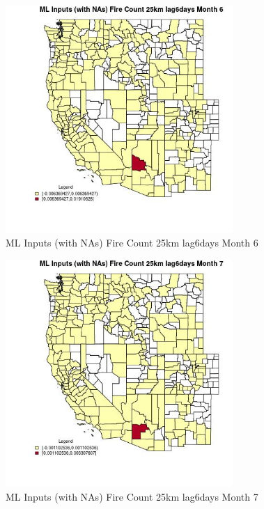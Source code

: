 \begin{figure} 
\centering  
\includegraphics[width=0.77\textwidth]{Code_Outputs/Report_ML_input_PM25_Step4_part_e_de_duplicated_aves_compiled_2019-05-20wNAs_CountyFire_Count_25km_lag6daysmedianMonth6.jpg} 
\caption{\label{fig:Report_ML_input_PM25_Step4_part_e_de_duplicated_aves_compiled_2019-05-20wNAsCountyFire_Count_25km_lag6daysmedianMonth6}ML Inputs (with NAs) Fire Count 25km lag6days Month 6} 
\end{figure} 
 

\begin{figure} 
\centering  
\includegraphics[width=0.77\textwidth]{Code_Outputs/Report_ML_input_PM25_Step4_part_e_de_duplicated_aves_compiled_2019-05-20wNAs_CountyFire_Count_25km_lag6daysmedianMonth7.jpg} 
\caption{\label{fig:Report_ML_input_PM25_Step4_part_e_de_duplicated_aves_compiled_2019-05-20wNAsCountyFire_Count_25km_lag6daysmedianMonth7}ML Inputs (with NAs) Fire Count 25km lag6days Month 7} 
\end{figure} 
 

